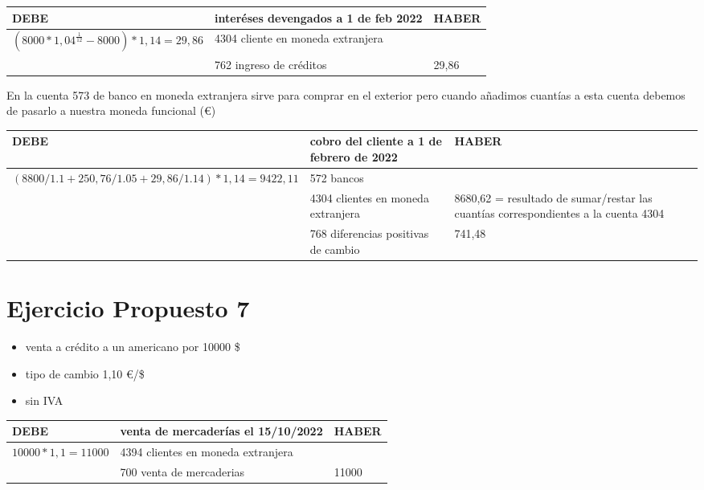 \documentclass[a4paper,12pt]{article}
\begin{document}
\begin{table}[H]
        \centering
        \begin{tabular}{|p{3cm}|p{6cm}|p{3cm}|}
        \hline
        \textbf{DEBE} & \textbf{interéses devengados a 1 de feb 2022} & \textbf{HABER} \\
        \hline
        $(8000*1,04^{\frac{1}{12}}-8000) * 1,14 = 29,86$& 4304 cliente en moneda extranjera& \\
        \hline
        & 762 ingreso de créditos& 29,86\\
        \hline
        \end{tabular}
\end{table}

\begin{tcolorbox}[colback=blue!5!white, colframe=blue!75!black, title=NOTA]
    En la cuenta 573 de banco en moneda extranjera sirve para comprar en el exterior pero cuando añadimos cuantías a esta cuenta debemos de pasarlo a nuestra moneda funcional (\euro)
\end{tcolorbox}

\begin{table}[H]
    \centering
    \begin{tabular}{|p{3cm}|p{6cm}|p{3cm}|}
    \hline
    \textbf{DEBE} & \textbf{cobro del cliente a 1 de febrero de 2022} & \textbf{HABER} \\
    \hline
    $(8800/1.1 + 250,76/1.05 + 29,86/1.14)*1,14 = 9422,11$& 572 bancos  & \\
    \hline
    & 4304 clientes en moneda extranjera & 8680,62 = resultado de sumar/restar las cuantías correspondientes a la cuenta 4304\\
    \hline
    & 768 diferencias positivas de cambio & 741,48 \\
    \hline
    \end{tabular}
\end{table}

\section{Ejercicio Propuesto 7}

\begin{itemize}
    \item venta a crédito a un americano por 10000 \$
    \item tipo de cambio 1,10 \euro/\$
    \item sin IVA
\end{itemize}
\begin{table}[H]
    \centering
    \begin{tabular}{|p{3cm}|p{6cm}|p{3cm}|}
    \hline
    \textbf{DEBE} & \textbf{venta de mercaderías el 15/10/2022} & \textbf{HABER} \\
    \hline
    $10000*1,1 = 11000$& 4394 clientes en moneda extranjera& \\
    \hline
    & 700 venta de mercaderias& 11000 \\
    \hline
    \end{tabular}
\end{table}
\end{document}
